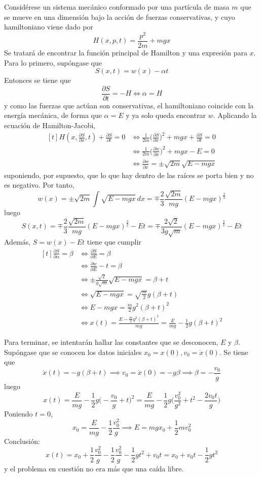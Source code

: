 \documentclass[12pt]{report}
\begin{document}
\begin{example}
Considérese un sistema mecánico conformado por una partícula de masa $m$ que se mueve en una dimensión bajo la acción de fuerzas conservativas, y cuyo hamiltoniano viene dado por
\[H(x,p,t) =\frac{p^2}{2m} + mgx\]
Se tratará de encontrar la función principal de Hamilton y una expresión para $x$. Para lo primero, supóngase que
\[S(x,t) = w(x)-\alpha t\]
Entonces se tiene que
\[\frac{\partial S}{\partial t} = -H \iff \alpha = H\]
y como las fuerzas que actúan son conservativas, el hamiltoniano coincide con la energía mecánica, de forma que $\alpha = E$ y ya solo queda encontrar $w$. Aplicando la ecuación de Hamilton-Jacobi,
\[
\begin{aligned}[t]
H(x,\frac{\partial S}{\partial x},t) + \frac{\partial S}{\partial t} = 0 &\iff \frac{1}{2m}\biggl( \frac{\partial S}{\partial x} \biggr)^2 + mgx + \frac{\partial S}{\partial t} = 0 \\
&\iff \frac{1}{2m}\biggl( \frac{\partial w}{\partial x} \biggr)^2 + mgx-E = 0 \\
&\iff \frac{\partial w}{\partial x} = \pm \sqrt{2m}\sqrt{E-mgx}
\end{aligned}
\]
suponiendo, por supuesto, que lo que hay dentro de las raíces se porta bien y no es negativo. Por tanto,
\[w(x) = \pm \sqrt{2m} \int \sqrt{E-mgx} \, dx = \mp \frac{2}{3} \frac{\sqrt{2m}}{mg}(E-mgx)^{\frac{3}{2}}\]
luego
\[S(x,t) =\mp \frac{2}{3} \frac{\sqrt{2m}}{mg}(E-mgx)^{\frac{3}{2}}-Et = \mp \frac{2\sqrt{2}}{3g\sqrt{m}}(E-mgx)^{\frac{3}{2}}-Et\]
Además, $S = w(x) - Et$ tiene que cumplir
\[
\begin{aligned}[t]
\frac{\partial S}{\partial \alpha} = \beta &\iff \frac{\partial S}{\partial E} = \beta \\[5pt]
&\iff \frac{\partial w}{\partial E} - t = \beta \\[5pt]
&\iff \pm \frac{\sqrt{2}}{g\sqrt{m}}\sqrt{E-mgx} = \beta + t \\[5pt]
&\iff \sqrt{E-mgx} = \sqrt{\frac{m}{2}}g(\beta+t) \\[5pt]
&\iff E-mgx = \frac{m}{2}g^2(\beta+t)^2 \\[5pt]
&\iff x(t)= \frac{E-\frac{m}{2}g^2(\beta+t)^2}{mg} = \frac{E}{mg} - \frac{1}{2}g(\beta+t)^2
\end{aligned}
\]

\noindent Para terminar, se intentarán hallar las constantes que se desconocen, $E$ y $\beta$. Supóngase que se conocen los datos iniciales $x_0 = x(0), v_0 = \dot{x}(0)$. Se tiene que
\[\dot{x}(t) = -g(\beta+t) \implies v_0 = \dot{x}(0) = -g\beta \implies \beta = -\frac{v_0}{g}\]
luego
\[x(t) = \frac{E}{mg} - \frac{1}{2}g\biggl(-\frac{v_0}{g}+t\biggr)^2 = \frac{E}{mg} - \frac{1}{2}g\biggl(\frac{v_0^2}{g^2}+t^2-\frac{2v_0t}{g}\biggr)\]
Poniendo $t = 0$,
\[x_0 = \frac{E}{mg} -\frac{1}{2}\frac{v_0^2}{g} \implies E = mgx_0+\frac{1}{2}mv_0^2\]
Conclusión:
\[x(t) = x_0+\frac{1}{2}\frac{v_0^2}{g}-\frac{1}{2}\frac{v_0^2}{g}-\frac{1}{2}gt^2+v_0t = x_0+v_0t-\frac{1}{2}gt^2\]
y el problema en cuestión no era más que una caída libre.
\end{example}
\end{document}
